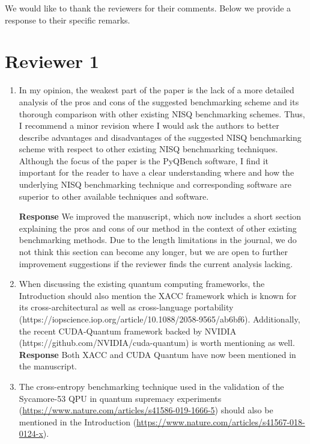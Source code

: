 \documentclass[a4paper,12pt]{article}
\newcommand{\1}{{\rm 1\hspace{-0.9mm}l}}
\newenvironment{response}{\vspace{1em}\noindent\textbf{Response}}{\vspace{1em}}
\begin{document}
We would like to thank the reviewers for their comments. Below we provide
a response to their specific remarks.

\section{Reviewer 1}

\begin{enumerate}
  \item  In my opinion, the weakest part of the paper is the lack of a more
    detailed analysis of the pros and cons of the suggested benchmarking scheme
    and its thorough comparison with other existing NISQ benchmarking schemes.
    Thus, I recommend a minor revision where I would ask the authors to better
    describe advantages and disadvantages of the suggested NISQ benchmarking
    scheme with respect to other existing NISQ benchmarking techniques.
    Although the focus of the paper is the PyQBench software, I find it
    important for the reader to have a clear understanding where and how the
    underlying NISQ benchmarking technique and corresponding software are
    superior to other available techniques and software.

    \begin{response}
      We improved the manuscript, which now includes a short section explaining
      the pros and cons of our method in the context of other existing
      benchmarking methods. Due to the length limitations in the journal, we do
      not think this section can become any longer, but we are open to further
      improvement suggestions if the reviewer finds the current analysis
      lacking.
    \end{response}
  \item When discussing the existing quantum computing frameworks, the
    Introduction should also mention the XACC framework which is known for its
    cross-architectural as well as cross-language portability
    (https://iopscience.iop.org/article/10.1088/2058-9565/ab6bf6).
    Additionally, the recent CUDA-Quantum framework backed by NVIDIA
    (https://github.com/NVIDIA/cuda-quantum) is worth mentioning as well.
    \begin{response}
      Both XACC and CUDA Quantum have now been mentioned in the manuscript.
    \end{response}
  \item The cross-entropy benchmarking technique used in the validation of the
    Sycamore-53 QPU in quantum supremacy experiments
    (\url{https://www.nature.com/articles/s41586-019-1666-5}) should also be
    mentioned in the Introduction
    (\url{https://www.nature.com/articles/s41567-018-0124-x}).


\end{enumerate}
\end{document}
